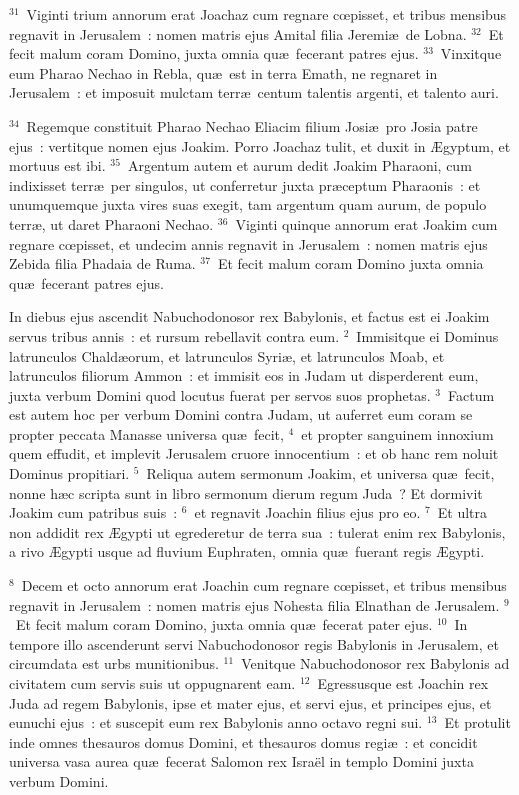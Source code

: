 ${}^{31}$~Viginti trium annorum erat Joachaz cum regnare cœpisset, et tribus mensibus regnavit in Jerusalem~: nomen matris ejus Amital filia Jeremi\ae\ de Lobna.
${}^{32}$~Et fecit malum coram Domino, juxta omnia qu\ae\ fecerant patres ejus.
${}^{33}$~Vinxitque eum Pharao Nechao in Rebla, qu\ae\ est in terra Emath, ne regnaret in Jerusalem~: et imposuit mulctam terr\ae\ centum talentis argenti, et talento auri.


${}^{34}$~Regemque constituit Pharao Nechao Eliacim filium Josi\ae\ pro Josia patre ejus~: vertitque nomen ejus Joakim. Porro Joachaz tulit, et duxit in \AE gyptum, et mortuus est ibi.
${}^{35}$~Argentum autem et aurum dedit Joakim Pharaoni, cum indixisset terr\ae\ per singulos, ut conferretur juxta pr\ae ceptum Pharaonis~: et unumquemque juxta vires suas exegit, tam argentum quam aurum, de populo terr\ae , ut daret Pharaoni Nechao.
${}^{36}$~Viginti quinque annorum erat Joakim cum regnare cœpisset, et undecim annis regnavit in Jerusalem~: nomen matris ejus Zebida filia Phadaia de Ruma.
${}^{37}$~Et fecit malum coram Domino juxta omnia qu\ae\ fecerant patres ejus.

\bchapter
\lettrine[lines=3,image=true,loversize=0.05,lraise=-0.03]{I}{}n diebus ejus ascendit Nabuchodonosor rex Babylonis, et factus est ei Joakim servus tribus annis~: et rursum rebellavit contra eum.
${}^{2}$~Immisitque ei Dominus latrunculos Chald\ae orum, et latrunculos Syri\ae , et latrunculos Moab, et latrunculos filiorum Ammon~: et immisit eos in Judam ut disperderent eum, juxta verbum Domini quod locutus fuerat per servos suos prophetas.
${}^{3}$~Factum est autem hoc per verbum Domini contra Judam, ut auferret eum coram se propter peccata Manasse universa qu\ae\ fecit,
${}^{4}$~et propter sanguinem innoxium quem effudit, et implevit Jerusalem cruore innocentium~: et ob hanc rem noluit Dominus propitiari.
${}^{5}$~Reliqua autem sermonum Joakim, et universa qu\ae\ fecit, nonne h\ae c scripta sunt in libro sermonum dierum regum Juda~? Et dormivit Joakim cum patribus suis~:
${}^{6}$~et regnavit Joachin filius ejus pro eo.
${}^{7}$~Et ultra non addidit rex \AE gypti ut egrederetur de terra sua~: tulerat enim rex Babylonis, a rivo \AE gypti usque ad fluvium Euphraten, omnia qu\ae\ fuerant regis \AE gypti.


${}^{8}$~Decem et octo annorum erat Joachin cum regnare cœpisset, et tribus mensibus regnavit in Jerusalem~: nomen matris ejus Nohesta filia Elnathan de Jerusalem.
${}^{9}$~Et fecit malum coram Domino, juxta omnia qu\ae\ fecerat pater ejus.
${}^{10}$~In tempore illo ascenderunt servi Nabuchodonosor regis Babylonis in Jerusalem, et circumdata est urbs munitionibus.
${}^{11}$~Venitque Nabuchodonosor rex Babylonis ad civitatem cum servis suis ut oppugnarent eam.
${}^{12}$~Egressusque est Joachin rex Juda ad regem Babylonis, ipse et mater ejus, et servi ejus, et principes ejus, et eunuchi ejus~: et suscepit eum rex Babylonis anno octavo regni sui.
${}^{13}$~Et protulit inde omnes thesauros domus Domini, et thesauros domus regi\ae~: et concidit universa vasa aurea qu\ae\ fecerat Salomon rex Isra\"el in templo Domini juxta verbum Domini.


